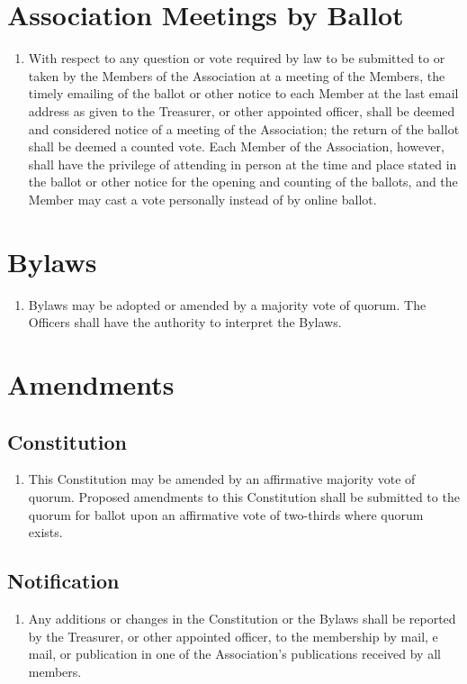 \documentclass[12pt,letterpaper]{article}
\begin{document}
\section{Association Meetings by Ballot}
\begin{enumerate}
	\item With respect to any question or vote required by law to be submitted to or
				taken by the Members of the Association at a meeting of the Members, the
				timely emailing of the ballot or other notice to each Member at the last
				email address as given to the Treasurer, or other appointed officer, shall be
				deemed and considered notice of a meeting of the Association; the return of
				the ballot shall be deemed a counted vote. Each Member of the Association,
				however, shall have the privilege of attending in person at the time and
				place stated in the ballot or other notice for the opening and counting of
				the ballots, and the Member may cast a vote personally instead of by online
				ballot.
\end{enumerate}

\section{Bylaws}
\begin{enumerate}
	\item Bylaws may be adopted or amended by a majority vote of quorum. The Officers
				shall have the authority to interpret the Bylaws.
\end{enumerate}

\section{Amendments}

\subsection{Constitution}
\begin{enumerate}
	\item This Constitution may be amended by an affirmative majority vote of quorum.
				Proposed amendments to this Constitution shall be submitted to the quorum for
				ballot upon an affirmative vote of two-thirds where quorum exists.
\end{enumerate}

\subsection{Notification}
\begin{enumerate}
	\item Any additions or changes in the Constitution or the Bylaws shall be reported
				by the Treasurer, or other appointed officer, to the membership by mail, e
				mail, or publication in one of the Association's publications received by all
				members.
\end{enumerate}
\end{document}
